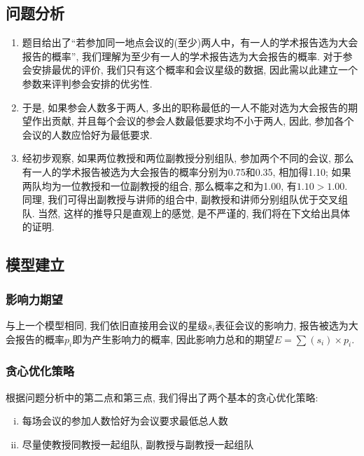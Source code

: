 \subsection{问题分析}
    \begin{enumerate}
        \item 题目给出了``若参加同一地点会议的(至少)两人中，有一人的学术报告选为大会报告的概率'',
                我们理解为至少有一人的学术报告选为大会报告的概率.
                对于参会安排最优的评价, 我们只有这个概率和会议星级的数据,
                因此需以此建立一个参数来评判参会安排的优劣性.
        \item 于是, 如果参会人数多于两人, 多出的职称最低的一人不能对选为大会报告的期望作出贡献,
                并且每个会议的参会人数最低要求均不小于两人,
                因此, 参加各个会议的人数应恰好为最低要求.
        \item 经初步观察, 如果两位教授和两位副教授分别组队, 参加两个不同的会议,
                那么有一人的学术报告被选为大会报告的概率分别为0.75和0.35, 相加得1.10;
                如果两队均为一位教授和一位副教授的组合, 那么概率之和为1.00,
                有$1.10>1.00$.
                同理, 我们可得出副教授与讲师的组合中, 副教授和讲师分别组队优于交叉组队.
                当然, 这样的推导只是直观上的感觉, 是不严谨的, 我们将在下文给出具体的证明.
    \end{enumerate}

\subsection{模型建立}
    \subsubsection{影响力期望}
        与上一个模型相同, 我们依旧直接用会议的星级$s_{i}$表征会议的影响力,
        报告被选为大会报告的概率$p_{i}$即为产生影响力的概率, 
        因此影响力总和的期望$E=\sum(s_{i})\times p_{i}.$
    \subsubsection{贪心优化策略}
        根据问题分析中的第二点和第三点, 我们得出了两个基本的贪心优化策略:
        \begin{enumerate}[(i)]
            \item 每场会议的参加人数恰好为会议要求最低总人数
            \item 尽量使教授同教授一起组队, 副教授与副教授一起组队
        \end{enumerate}
        
